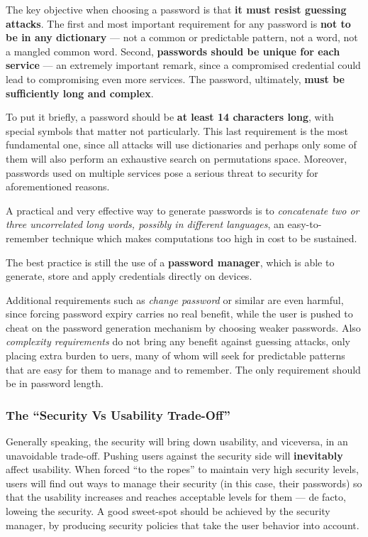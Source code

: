 \documentclass[10pt]{\classname}
\begin{document}
The key objective when choosing a password is that \textbf{it must resist
guessing attacks}. The first and most important requirement for any password is
\textbf{not to be in any dictionary} --- not a common or predictable pattern,
not a word, not a mangled common word. Second, \textbf{passwords should be
unique for each service} --- an extremely important remark, since a compromised
credential could lead to compromising even more services. The password,
ultimately, \textbf{must be sufficiently long and complex}.

To put it briefly, a password should be \textbf{at least 14 characters long},
with special symbols that matter not particularly. This last requirement is the
most fundamental one, since all attacks will use dictionaries and perhaps only
some of them will also perform an exhaustive search on permutations space. Moreover,
passwords used on multiple services pose a serious threat to security for
aforementioned reasons.

A practical and very effective way to generate passwords is to
\emph{concatenate two or three uncorrelated long words, possibly in different
languages}, an easy\--to\--remember technique which makes computations too high
in cost to be sustained.

The best practice is still the use of a \textbf{password manager}, which is
able to generate, store and apply credentials directly on devices.

Additional requirements such as \emph{change password} or similar are even
harmful, since forcing password expiry carries no real benefit, while the user
is pushed to cheat on the password generation mechanism by choosing weaker
passwords. Also \emph{complexity requirements} do not bring any benefit against
guessing attacks, only placing extra burden to uers, many of whom will seek for
predictable patterns that are easy for them to manage and to remember. The only
requirement should be in password length.

\subsubsection{The ``Security Vs Usability Trade\--Off''}

Generally speaking, the security will bring down usability, and viceversa, in
an unavoidable trade\--off. Pushing users against the security side will
\textbf{inevitably} affect usability. When forced ``to the ropes'' to maintain
very high security levels, users will find out ways to manage their security
(in this case, their passwords) so that the usability increases and reaches
acceptable levels for them --- de facto, loweing the security. A good
sweet\--spot should be achieved by the security manager, by producing security
policies that take the user behavior into account.
\end{document}
